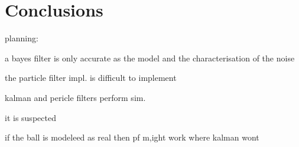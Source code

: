 \section{Conclusions}
planning:

a bayes filter is only accurate as the model and the characterisation of the noise

the particle filter impl. is difficult to implement

kalman and pericle filters perform sim.

it is suspected

if the ball is modeleed as real then pf m,ight work where kalman wont